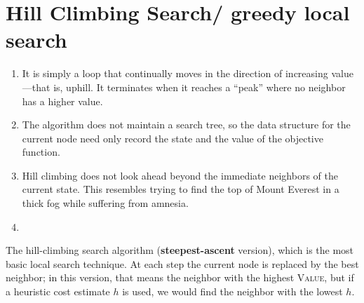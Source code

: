\section{Hill Climbing Search/ greedy local search}


\begin{enumerate}[itemsep=0.2cm]
    \item It is simply a loop that continually moves in the direction of increasing value—that is, uphill. 
    It terminates when it reaches a “peak” where no neighbor has a higher value.
    \hfill \cite{ai/book/Artificial-Intelligence-A-Modern-Approach/Russell-Norvig}

    \item The algorithm does not maintain a search tree, so the data structure for the current node need only record the state and the value of the objective function. 
    \hfill \cite{ai/book/Artificial-Intelligence-A-Modern-Approach/Russell-Norvig}

    \item Hill climbing does not look ahead beyond the immediate neighbors of the current state. This resembles trying to find the top of Mount Everest in a thick fog while suffering from amnesia.
    \hfill \cite{ai/book/Artificial-Intelligence-A-Modern-Approach/Russell-Norvig}

    \item 
    \hfill \cite{ai/book/Artificial-Intelligence-A-Modern-Approach/Russell-Norvig}
\end{enumerate}

\vspace{0.5cm}

\begin{algorithm}[H]
    \caption{
        The hill-climbing search algorithm (\textbf{steepest-ascent} version), which is the most basic local search technique. 
        At each step the current node is replaced by the best neighbor; in this version, that means the neighbor with the highest \textsc{Value}, but if a heuristic cost estimate $h$ is used, we would find the neighbor with the lowest $h$. 
        \cite{ai/book/Artificial-Intelligence-A-Modern-Approach/Russell-Norvig}}

\end{algorithm}















